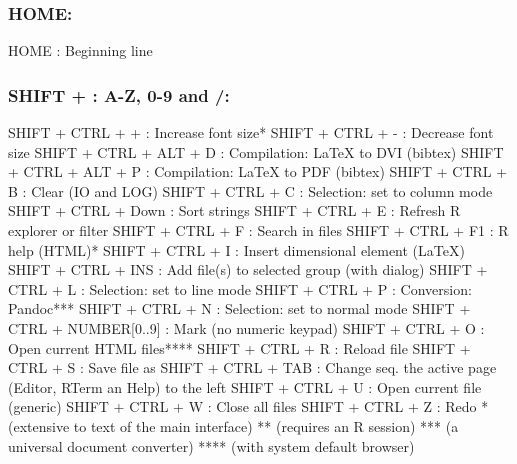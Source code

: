 \subsubsection{HOME:}

\vspace{-0.5cm}
\begin{Rtables}[caption={[HOME keyboard shortcut]
    HOME keyboard shortcut},
  label=shortcut:home]
  HOME : Beginning line
\end{Rtables}


\newpage
\subsubsection{SHIFT + : A-Z, 0-9 and /:}

\begin{Rtables}[caption={[SHIFT + keyboard shortcuts]
    SHIFT + keyboard shortcuts},
  label=shortcut:shiftplus]
  SHIFT + CTRL + +            : Increase font size*
  SHIFT + CTRL + -            : Decrease font size
  SHIFT + CTRL + ALT + D      : Compilation: LaTeX to DVI (bibtex)
  SHIFT + CTRL + ALT + P      : Compilation: LaTeX to PDF (bibtex)
  SHIFT + CTRL + B            : Clear (IO and LOG)
  SHIFT + CTRL + C            : Selection: set to column mode
  SHIFT + CTRL + Down         : Sort strings
  SHIFT + CTRL + E            : Refresh R explorer or filter
  SHIFT + CTRL + F            : Search in files
  SHIFT + CTRL + F1           : R help (HTML)*
  SHIFT + CTRL + I            : Insert dimensional element (LaTeX)
  SHIFT + CTRL + INS          : Add file(s) to selected group (with dialog)
  SHIFT + CTRL + L            : Selection: set to line mode
  SHIFT + CTRL + P            : Conversion: Pandoc***
  SHIFT + CTRL + N            : Selection: set to normal mode
  SHIFT + CTRL + NUMBER[0..9] : Mark (no numeric keypad)
  SHIFT + CTRL + O            : Open current HTML files****
  SHIFT + CTRL + R            : Reload file
  SHIFT + CTRL + S            : Save file as
  SHIFT + CTRL + TAB          : Change seq. the active page
                                (Editor, RTerm an Help) to the left
  SHIFT + CTRL + U            : Open current file (generic)
  SHIFT + CTRL + W            : Close all files
  SHIFT + CTRL + Z            : Redo
  *    (extensive to text of the main interface)
  **   (requires an R session)
  ***  (a universal document converter)
  **** (with system default browser)
\end{Rtables}


